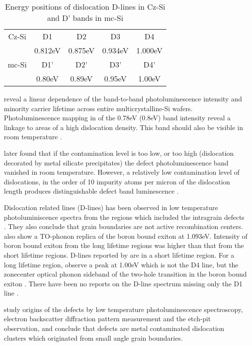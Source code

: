 \begin{table}[H]
\centering
\begin{tabular}{|c|c|c|c|c|}
\hline
Cz-Si \cite{drozdov76} & D1 & D2 & D3 & D4 \\
	& 0.812eV & 0.875eV & 0.934eV & 1.000eV \\
\hline
mc-Si \cite{tarasov00} & D1' & D2' & D3' & D4' \\
		& 0.80eV & 0.89eV & 0.95eV & 1.00eV \\
\hline
\end{tabular}
\caption{Energy positions of dislocation D-lines in Cz-Si and D' bands in mc-Si}
\label{tarasovlines}
\end{table}


\cite{tarasov00} reveal a linear dependence of the band-to-band photoluminescence intensity and minority carrier lifetime across entire multicrystalline-Si wafers. Photoluminescence mapping in \cite{tarasov00} of the 0.78eV (0.8eV) band intensity reveal a linkage to areas of a high dislocation density. This band should also be visible in room temperature \cite{tarasov00}.

\cite{tarasov01} later found that if the contamination level is too low, or too high (dislocation decorated by metal silicate precipitates) the defect photoluminescence band vanished in room temperature. However, a relatively low contamination level of dislocations, in the order of 10 impurity atoms per micron of the dislocation length produces distinguishable defect band luminescence \cite{tarasov01}. 

Dislocation related lines (D-lines) has been observed in low temperature photoluminiscence spectra from the regions which included the intragrain defects \cite{sugimoto06}. They also conclude that grain boundaries are not active recombination centers. \cite{sugimoto06} also show a TO-phonon replica of the boron bound exiton at 1.093eV. Intensity of boron bound exiton from the long lifetime regions was higher than that from the short lifetime regions. D-lines reported by \cite{sauer85} are in a short lifetime region. For a long lifetime region, \cite{sugimoto06} observe a peak at 1.00eV which is not the D4 line, but the zonecenter optical phonon sideband of the two-hole transition in the boron bound exiton \cite{dean67}. There have been no reports on the D-line spectrum missing only the D1 line \cite{sugimoto06}.


\cite{sugimoto07} study origins of the defects by low temperature photoluminescence spectroscopy, electron backscatter diffraction pattern measurement and the etch-pit observation, and conclude that defects are metal contaminated dislocation clusters which originated from small angle grain boundaries.






